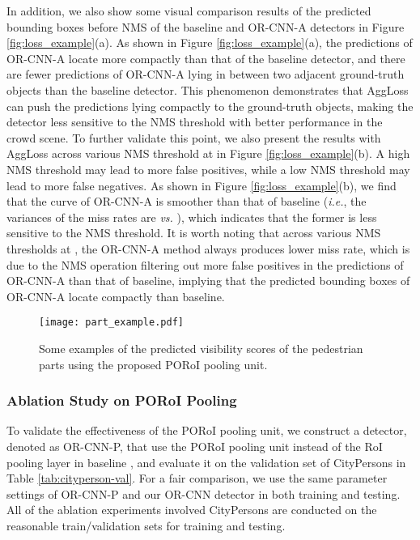 \documentclass[runningheads]{llncs}
\def\ie{{\em i.e.}}
\begin{document}
In addition, we also show some visual comparison results of the predicted bounding boxes before NMS of the baseline and OR-CNN-A detectors in Figure \ref{fig:loss_example}(a). As shown in Figure \ref{fig:loss_example}(a), the predictions of OR-CNN-A locate more compactly than that of the baseline detector, and there are fewer predictions of OR-CNN-A lying in between two adjacent ground-truth objects than the baseline detector. This phenomenon demonstrates that AggLoss can push the predictions lying compactly to the ground-truth objects, making the detector less sensitive to the NMS threshold with better performance in the crowd scene. To further validate this point, we also present the results with AggLoss across various NMS threshold at  in Figure \ref{fig:loss_example}(b). A high NMS threshold may lead to more false positives, while a low NMS threshold may lead to more false negatives. As shown in Figure \ref{fig:loss_example}(b), we find that the curve of OR-CNN-A is smoother than that of baseline (\ie, the variances of the miss rates are  {\em vs.} ), which indicates that the former is less sensitive to the NMS threshold. It is worth noting that across various NMS thresholds at , the OR-CNN-A method always produces lower miss rate, which is due to the NMS operation filtering out more false positives in the predictions of OR-CNN-A than that of baseline, implying that the predicted bounding boxes of OR-CNN-A locate compactly than baseline.


\begin{figure*}[t]
\centering
\texttt{[image: part\_example.pdf]}
\caption{Some examples of the predicted visibility scores of the pedestrian parts using the proposed PORoI pooling unit.}
\label{fig:part_example}
\end{figure*}


\subsubsection{Ablation Study on PORoI Pooling}
To validate the effectiveness of the PORoI pooling unit, we construct a detector, denoted as OR-CNN-P, that use the PORoI pooling unit instead of the RoI pooling layer in baseline \cite{DBLP:conf/cvpr/ZhangBS17}, and evaluate it on the validation set of CityPersons in Table \ref{tab:cityperson-val}. For a fair comparison, we use the same parameter settings of OR-CNN-P and our OR-CNN detector in both training and testing. All of the ablation experiments involved CityPersons are conducted on the reasonable train/validation sets for training and testing.
\end{document}
